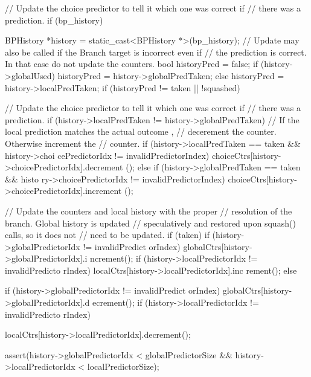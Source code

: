 \begin{DoxyCode}
{
    // Update the choice predictor to tell it which one was correct if
    // there was a prediction.
    if (bp_history) {
        BPHistory *history = static_cast<BPHistory *>(bp_history);
        // Update may also be called if the Branch target is incorrect even if
        // the prediction is correct. In that case do not update the counters.
        bool historyPred = false;
        if (history->globalUsed) {
           historyPred = history->globalPredTaken;
        } else {
           historyPred = history->localPredTaken;
        }
        if (historyPred != taken || !squashed) {
            // Update the choice predictor to tell it which one was correct if
            // there was a prediction.
                        if (history->localPredTaken != history->globalPredTaken) 
      {
                            // If the local prediction matches the actual outcome
      ,
                            // decerement the counter.  Otherwise increment the
                            // counter.
                            if (history->localPredTaken == taken && history->choi
      cePredictorIdx != invalidPredictorIndex) {
                                choiceCtrs[history->choicePredictorIdx].decrement
      ();
                            } else if (history->globalPredTaken == taken && histo
      ry->choicePredictorIdx != invalidPredictorIndex) {
                                choiceCtrs[history->choicePredictorIdx].increment
      ();
                            }
                        }
                        
                        // Update the counters and local history with the proper
                        // resolution of the branch.  Global history is updated
                        // speculatively and restored upon squash() calls, so it 
      does not
                        // need to be updated.
                        if (taken) {
                                if (history->globalPredictorIdx != invalidPredict
      orIndex) {
                                        globalCtrs[history->globalPredictorIdx].i
      ncrement();
                                }
                                if (history->localPredictorIdx != invalidPredicto
      rIndex) {
                                        localCtrs[history->localPredictorIdx].inc
      rement();
                                }
                        } else {
                                if (history->globalPredictorIdx != invalidPredict
      orIndex) {
                                        globalCtrs[history->globalPredictorIdx].d
      ecrement();
                                }
                                if (history->localPredictorIdx != invalidPredicto
      rIndex) {
                               localCtrs[history->localPredictorIdx].decrement();
      
                                }
                        }
                        assert(history->globalPredictorIdx < globalPredictorSize 
      &&
                               history->localPredictorIdx < localPredictorSize);
                }
    }
}
\end{DoxyCode}


